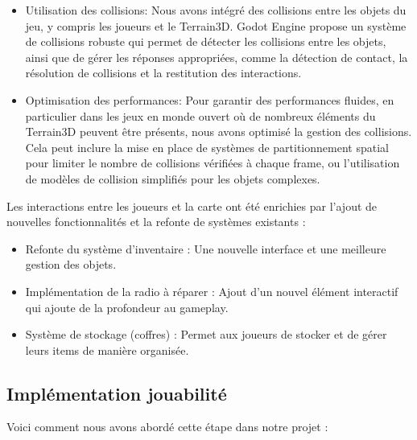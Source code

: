 \documentclass[
	article,			%
	11pt,				%
	oneside,			%
	a4paper,			%
	chapter=TITLE,
	french,			%
	sumario=tradicional
	]{base_nt}
\begin{document}
\begin{itemize}
    \item Utilisation des collisions: Nous avons intégré des collisions entre les objets du jeu, y compris les joueurs et le Terrain3D. Godot Engine propose un système de collisions robuste qui permet de détecter les collisions entre les objets, ainsi que de gérer les réponses appropriées, comme la détection de contact, la résolution de collisions et la restitution des interactions.
    \item Optimisation des performances: Pour garantir des performances fluides, en particulier dans les jeux en monde ouvert où de nombreux éléments du Terrain3D peuvent être présents, nous avons optimisé la gestion des collisions. Cela peut inclure la mise en place de systèmes de partitionnement spatial pour limiter le nombre de collisions vérifiées à chaque frame, ou l'utilisation de modèles de collision simplifiés pour les objets complexes.
\end{itemize}

Les interactions entre les joueurs et la carte ont été enrichies par l'ajout de nouvelles fonctionnalités et la refonte de systèmes existants :

\begin{itemize}
    \item Refonte du système d'inventaire : Une nouvelle interface et une meilleure gestion des objets.
    \item Implémentation de la radio à réparer : Ajout d'un nouvel élément interactif qui ajoute de la profondeur au gameplay.
    \item Système de stockage (coffres) : Permet aux joueurs de stocker et de gérer leurs items de manière organisée.
\end{itemize}

\newpage

\subsection{Implémentation jouabilité}

Voici comment nous avons abordé cette étape dans notre projet :
\end{document}
